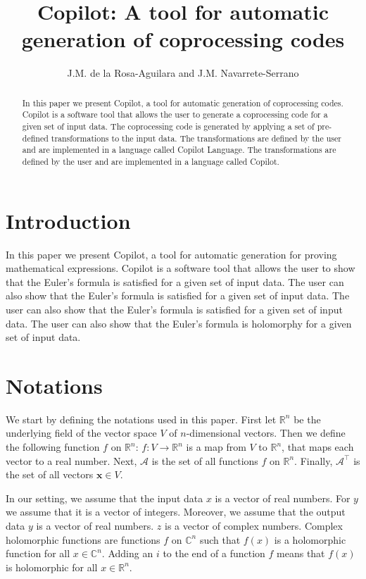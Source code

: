 \documentclass{article}
\title{Copilot: A tool for automatic generation of coprocessing codes}
\author{J.M. de la Rosa-Aguilara and J.M. Navarrete-Serrano}
\begin{document}
\maketitle

\begin{abstract}
    In this paper we present Copilot, a tool for automatic generation of
    coprocessing codes. Copilot is a software tool that allows the user to
    generate a coprocessing code for a given set of input data. The coprocessing
    code is generated by applying a set of pre-defined transformations to the
    input data. The transformations are defined by the user and are
    implemented in a language called Copilot Language. The transformations
    are defined by the user and are implemented in a language called Copilot.
\end{abstract}

\section{Introduction}

In this paper we present Copilot, a tool for automatic generation for proving 
mathematical expressions. Copilot is a software tool that allows the user to
show that the Euler's formula is satisfied for a given set of input data. The
user can also show that the Euler's formula is satisfied for a given set of
input data. The user can also show that the Euler's formula is satisfied for a
given set of input data. The user can also show that the Euler's formula is
holomorphy for a given set of input data.

\section{Notations}

We start by defining the notations used in this paper. First let $\mathbb{R}^n$ be the underlying
field of the vector space $V$ of $n$-dimensional vectors. Then we define the following function $f$
on $\mathbb{R}^n$: $f:V\to\mathbb{R}^n$ is a map from $V$ to $\mathbb{R}^n$, that maps each vector to a real number. Next, $\mathcal{A}$ is the set of all functions $f$ on $\mathbb{R}^n$. Finally, $\mathcal{A}^\top$ is the set of all vectors $\mathbf{x} \in V$.

In our setting, we assume that the input data $x$ is a vector of real numbers. For $y$ we assume that it is a vector of integers. Moreover, we assume that the output data $y$ is a vector of real numbers. $z$ is a vector of complex numbers. Complex holomorphic functions are functions $f$ on $\mathbb{C}^n$ such that $f(x)$ is a holomorphic function for all $x \in \mathbb{C}^n$. Adding an $i$ to the end of a function $f$ means that $f(x)$ is holomorphic for all $x \in \mathbb{R}^n$.
\end{document}
